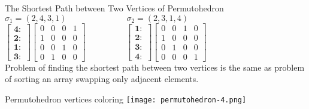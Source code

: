 \documentclass{beamer}
\theoremstyle{plain}
\theoremstyle{definition}
\begin{document}
\begin{frame}{The Shortest Path between Two Vertices of Permutohedron}
     $\sigma_1 = (2,4,3,1) \hspace{3cm} \sigma_2 = (2,3,1,4)$ \\ \vspace{0.3cm}
    $\begin{bmatrix}
        \mathbf{4: } \\ \mathbf{2: } \\ \mathbf{1: } \\ \mathbf{3: }  
    \end{bmatrix} \begin{bmatrix}
        0 & 0 & 0 & 1 \\ 1 & 0 & 0 & 0 \\ 0 & 0 & 1 & 0 \\ 0 & 1 & 0 & 0
    \end{bmatrix} \hspace{2cm}  \begin{bmatrix}
        \mathbf{1: } \\ \mathbf{2: } \\ \mathbf{3: } \\ \mathbf{4: }  
    \end{bmatrix} \begin{bmatrix}
          0 & 0 & 1 & 0 \\ 1 & 0 & 0 & 0 \\ 0 & 1 & 0 & 0 \\ 0 & 0 & 0 & 1
    \end{bmatrix} $ \\ \vspace{0.3cm}
    \pause
    Problem of finding the shortest path between two vertices is the same as problem of sorting an array swapping only adjacent elements.
\end{frame}
\begin{frame}{Permutohedron vertices coloring}
\centering
    \texttt{[image: permutohedron-4.png]}
\end{frame}
\end{document}
